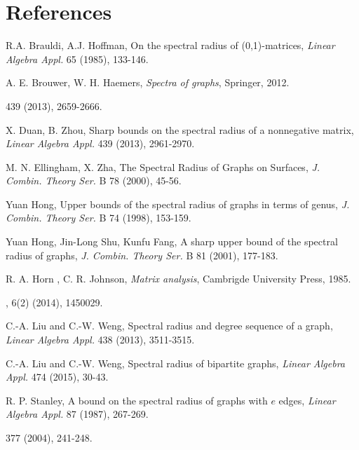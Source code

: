 \documentclass[final,3p, times, 12pt]{elsarticle}
\theoremstyle{plain}
\theoremstyle{definition}
\theoremstyle{remark}
\numberwithin{equation}{section}
\begin{document}
\section*{References}
\begin{thebibliography}{20}\frenchspacing

R.A. Brauldi, A.J. Hoffman, On the spectral radius of (0,1)-matrices,
{\it Linear Algebra Appl.} 65 (1985), 133-146.



A. E. Brouwer, W. H. Haemers, {\it Spectra of graphs}, Springer, 2012.



 439 (2013), 2659-2666.

X. Duan, B. Zhou, Sharp bounds on the spectral radius of a nonnegative matrix,
{\it Linear Algebra Appl.} 439 (2013), 2961-2970.

M. N. Ellingham, X. Zha, The Spectral Radius of Graphs on Surfaces,
{\it J. Combin. Theory Ser.} B 78 (2000), 45-56.

Yuan Hong, Upper bounds of the spectral radius of graphs in terms of genus,
{\it J. Combin. Theory Ser.} B 74 (1998), 153-159.

Yuan Hong, Jin-Long Shu, Kunfu Fang, A sharp upper bound of the spectral radius of graphs,
{\it J. Combin. Theory Ser.} B 81 (2001), 177-183.

 R. A. Horn , C. R. Johnson, {\it Matrix analysis}, Cambrigde University Press, 1985.

,
 6(2) (2014), 1450029.

C.-A. Liu and C.-W. Weng, Spectral radius and degree sequence of a graph,
{\it Linear Algebra Appl.} 438 (2013), 3511-3515.

C.-A. Liu and C.-W. Weng, Spectral radius of bipartite graphs,
{\it Linear Algebra Appl.} 474 (2015), 30-43.



R. P. Stanley, A bound on the spectral radius of graphs with $e$ edges,
{\it Linear Algebra Appl.} 87 (1987), 267-269.


 377 (2004), 241-248.

\end{thebibliography}
\end{document}
